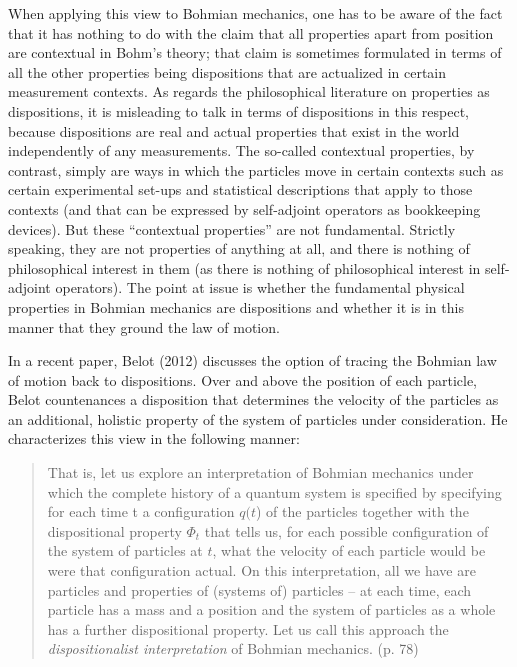 \documentclass[12pt,a4paper]{article}
\theoremstyle{definition}
\begin{document}
When applying this view to Bohmian mechanics, one has to be aware of the fact that it has nothing to do with the claim that all properties apart from position are contextual in Bohm's theory; that claim is sometimes formulated in terms of all the other properties being dispositions that are actualized in certain measurement contexts. As regards the philosophical literature on properties as dispositions, it is misleading to talk in terms of dispositions in this respect, because dispositions are real and actual properties that exist in the world independently of any measurements. The so-called contextual properties, by contrast, simply are ways in which the particles move in certain contexts such as certain experimental set-ups and statistical descriptions that apply to those contexts (and that can be expressed by self-adjoint operators as bookkeeping devices). But these ``contextual properties'' are not fundamental. Strictly speaking, they are not properties of anything at all, and there is nothing of philosophical interest in them (as there is nothing of philosophical interest in self-adjoint operators). The point at issue is whether the fundamental physical properties in Bohmian mechanics are dispositions and whether it is in this manner that they ground the law of motion.

In a recent paper, Belot (2012) discusses the option of tracing the Bohmian law of motion back to dispositions. Over and above the position of each particle, Belot countenances a disposition that determines the velocity of the particles as an additional, holistic property of the system of particles under consideration. He characterizes this view in the following manner:

\begin{quote}That is, let us explore an interpretation of Bohmian mechanics under which the complete history of a quantum system is specified by specifying for each time t a configuration $q(t$) of the particles together with the dispositional property $\Phi_t$ that tells us, for each possible configuration of the system of particles at $t$, what the velocity of each particle would be were that configuration actual. On this interpretation, all we have are particles and properties of (systems of) particles -- at each time, each particle has a mass and a position and the system of particles as a whole has a further dispositional property. Let us call this approach the \emph{dispositionalist interpretation} of Bohmian mechanics. (p. 78)\end{quote}
\end{document}
